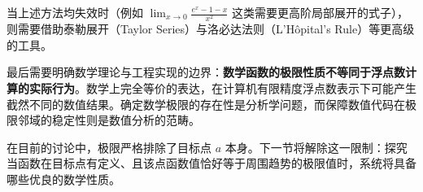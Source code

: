 当上述方法均失效时（例如 \(\lim_{x\to0}\frac{e^x-1-x}{x^2}\) 这类需要更高阶局部展开的式子），则需要借助泰勒展开（Taylor Series）与洛必达法则（L'Hôpital's Rule）等更高级的工具。

最后需要明确数学理论与工程实现的边界：\textbf{数学函数的极限性质不等同于浮点数计算的实际行为}。数学上完全等价的表达，在计算机有限精度浮点数表示下可能产生截然不同的数值结果。确定数学极限的存在性是分析学问题，而保障数值代码在极限邻域的稳定性则是数值分析的范畴。

在目前的讨论中，极限严格排除了目标点 \(a\) 本身。下一节将解除这一限制：探究当函数在目标点有定义、且该点函数值恰好等于周围趋势的极限值时，系统将具备哪些优良的数学性质。